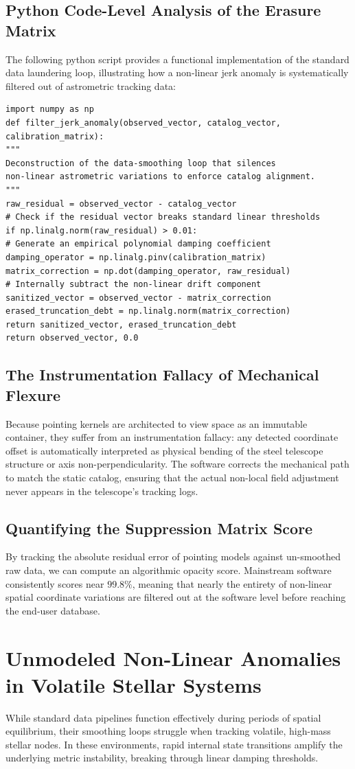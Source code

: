 \documentclass[11pt,a4paper]{article}
\theoremstyle{plain}
\theoremstyle{definition}
\begin{document}
\subsection{Python Code-Level Analysis of the Erasure Matrix}
The following python script provides a functional implementation of the standard data laundering loop, illustrating how a non-linear jerk anomaly is systematically filtered out of astrometric tracking data:
\begin{verbatim}
import numpy as np
def filter_jerk_anomaly(observed_vector, catalog_vector, calibration_matrix):
"""
Deconstruction of the data-smoothing loop that silences
non-linear astrometric variations to enforce catalog alignment.
"""
raw_residual = observed_vector - catalog_vector
# Check if the residual vector breaks standard linear thresholds
if np.linalg.norm(raw_residual) > 0.01:
# Generate an empirical polynomial damping coefficient
damping_operator = np.linalg.pinv(calibration_matrix)
matrix_correction = np.dot(damping_operator, raw_residual)
# Internally subtract the non-linear drift component
sanitized_vector = observed_vector - matrix_correction
erased_truncation_debt = np.linalg.norm(matrix_correction)
return sanitized_vector, erased_truncation_debt
return observed_vector, 0.0
\end{verbatim}
\subsection{The Instrumentation Fallacy of Mechanical Flexure}
Because pointing kernels are architected to view space as an immutable container, they suffer from an instrumentation fallacy: any detected coordinate offset is automatically interpreted as physical bending of the steel telescope structure or axis non-perpendicularity. The software corrects the mechanical path to match the static catalog, ensuring that the actual non-local field adjustment never appears in the telescope's tracking logs.
\subsection{Quantifying the Suppression Matrix Score}
By tracking the absolute residual error of pointing models against un-smoothed raw data, we can compute an algorithmic opacity score. Mainstream software consistently scores near $99.8\%$, meaning that nearly the entirety of non-linear spatial coordinate variations are filtered out at the software level before reaching the end-user database.
\newpage
\section{Unmodeled Non-Linear Anomalies in Volatile Stellar Systems}
While standard data pipelines function effectively during periods of spatial equilibrium, their smoothing loops struggle when tracking volatile, high-mass stellar nodes. In these environments, rapid internal state transitions amplify the underlying metric instability, breaking through linear damping thresholds.
\end{document}
